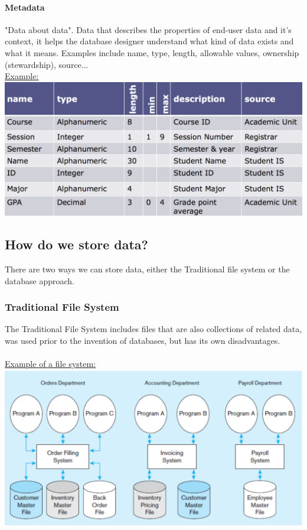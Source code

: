 \documentclass[12pt]{article}
\begin{document}
\paragraph{Metadata} "Data about data". Data that describes the properties of end-user data and it's context, it helps the database designer understand what kind of data exists and what it means. Examples include name, type, length, allowable values, ownership (stewardship), source...
\\
\underline{Example:}\\
\includegraphics[scale=0.5]{lec1-1}

\subsection{How do we store data?}

There are two ways we can store data, either the Traditional file system or the database approach.

\subsubsection{Traditional File System}

The Traditional File System includes files that are also collections of related data, was used prior to the invention of databases, but has its own disadvantages.\\
\\
\underline{Example of a file system:}\\
\includegraphics[scale=0.5]{lec1-2}\\
\end{document}
